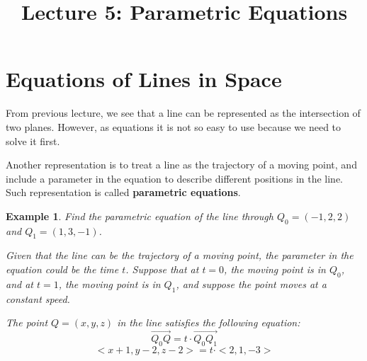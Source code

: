\documentclass{article}
\title{Lecture 5: Parametric Equations}
\author{}
\date{}
\newtheorem{example}{Example}
\begin{document}
    
\maketitle

\section{Equations of Lines in Space}

From previous lecture, we see that a line can be represented as the intersection 
of two planes. However, as equations it is not so easy to use because we need to 
solve it first.

Another representation is to treat a line as the trajectory of a moving point, 
and include a parameter in the equation to describe different positions in the 
line. Such representation is called \textbf{parametric equations}.

\begin{example}
  Find the parametric equation of the line through $Q_0 = (-1, 2, 2)$ and 
  $Q_1 = (1, 3, -1)$.

  Given that the line can be the trajectory of a moving point, the parameter in 
  the equation could be the time $t$. Suppose that at $t = 0$, the moving point 
  is in $Q_0$, and at $t = 1$, the moving point is in $Q_1$, and suppose the 
  point moves at a constant speed.

  The point $Q = (x, y, z)$ in the line satisfies the following equation:
  \[
    \vec{Q_0Q} = t \cdot \vec{Q_0Q_1}
  \]
  \[
    <x + 1, y - 2, z - 2> = t \cdot <2, 1, -3>
  \]
\end{example}
\end{document}
